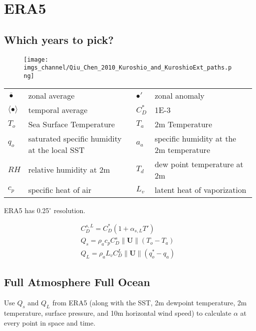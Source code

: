 \documentclass[12pt,a4paper]{article}
\newcommand{\Vmag}[1]{\| \mathbf{#1}\|}
\begin{document}
\newpage

\section{ERA5}


\subsection{Which years to pick?}

\begin{figure}[h!]
\texttt{[image: imgs\_channel/Qiu\_Chen\_2010\_Kuroshio\_and\_KuroshioExt\_paths.png]}
\caption{\citet{Aiu2010}}
\end{figure}

\begin{table}[h!]
\begin{tabular}{llll}
$\bar{\bullet}$ & zonal average & $\bullet'$ & zonal anomaly\\
$\langle\bullet\rangle$ & temporal average & $C_D^*$ & 1E-3\\
$T_o$ & Sea Surface Temperature & $T_a$ & 2m Temperature\\
$q_o$ & saturated specific humidity at the local SST & $a_a$ & specific humidity at the 2m temperature \\
$RH$ & relative humidity at 2m & $T_d$ & dew point temperature at 2m\\
$c_p$ & specific heat of air & $L_v$ & latent heat of vaporization 
\end{tabular}

\end{table}

ERA5 has 0.25$^{\circ}$ resolution.

\begin{align}
C_D^{s,L} = C_D^*(1+\alpha_{s,L} T')\\
Q_s = \rho_a c_p C_D^s \Vmag{U} (T_o-T_a)\\
Q_L = \rho_a L_v C_D^L \Vmag{U} (q_o^*-q_a)
\end{align}

\subsection{Full Atmosphere Full Ocean}\label{sec:full}
Use $Q_s$ and $Q_L$ from ERA5 (along with the SST, 2m dewpoint temperature, 2m temperature, surface pressure, and 10m horizontal wind speed) to calculate $\alpha$ at every point in space and time. 
\end{document}
